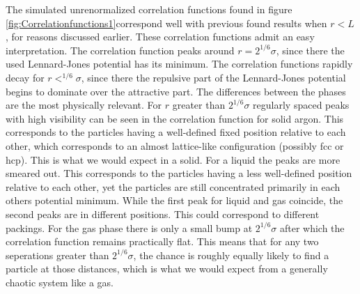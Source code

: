 The simulated unrenormalized correlation functions found in figure \ref{fig:Correlationfunctions1}correspond well with previous found results \cite{PhysRev.136.A405}\cite{yoon1981radial}\cite{franchetti1975radial}\cite{jos} when $r<L$, for reasons discussed earlier. These correlation functions admit an easy interpretation. The correlation function peaks around $r = 2^{1/6} \sigma$, since there the used Lennard-Jones potential has its minimum. The correlation functions rapidly decay for $r<^{1/6} \sigma$, since there the repulsive part of the Lennard-Jones potential begins to dominate over the attractive part. The differences between the phases are the most physically relevant. For $r$ greater than $2^{1/6}\sigma$ regularly spaced peaks with high visibility can be seen in the correlation function for solid argon. This corresponds to the particles having a well-defined fixed position relative to each other, which corresponds to an almost lattice-like configuration (possibly fcc or hcp\cite{van1991can}). This is what we would expect in a solid. For a liquid the peaks are more smeared out. This corresponds to the particles having a less well-defined position relative to each other, yet the particles are still concentrated primarily in each others potential minimum. While the first peak for liquid and gas coincide, the second peaks are in different positions. This could correspond to different packings. For the gas phase there is only a small bump at $2^{1/6}\sigma$ after which the correlation function remains practically flat. This means that for any two seperations greater than $2^{1/6}\sigma$, the chance is roughly equally likely to find a particle at those distances, which is what we would expect from a generally chaotic system like a gas.






